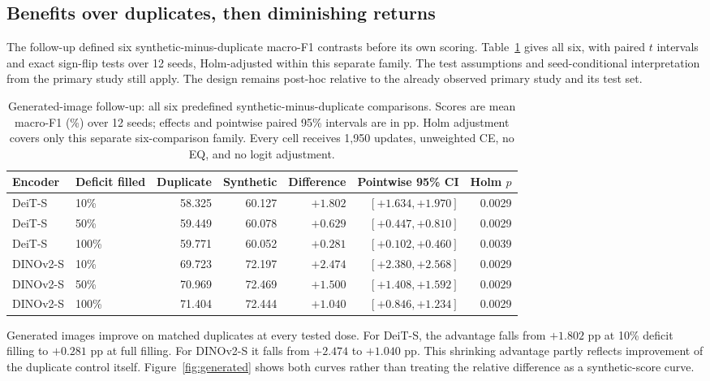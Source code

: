 \documentclass[conference]{IEEEtran}
\begin{document}
\subsection{Benefits over duplicates, then diminishing returns}
The follow-up defined six synthetic-minus-duplicate macro-F1 contrasts before its own scoring. Table~\ref{tab:generated} gives all six, with paired $t$ intervals and exact sign-flip tests over 12 seeds, Holm-adjusted within this separate family. The test assumptions and seed-conditional interpretation from the primary study still apply. The design remains post-hoc relative to the already observed primary study and its test set.

\begin{table}[t]
\centering\footnotesize
\caption{Generated-image follow-up: all six predefined synthetic-minus-duplicate comparisons. Scores are mean macro-F1 (\%) over 12 seeds; effects and pointwise paired 95\% intervals are in pp. Holm adjustment covers only this separate six-comparison family. Every cell receives 1,950 updates, unweighted CE, no EQ, and no logit adjustment.}
\label{tab:generated}
\begin{tabular}{llrrrrr}
\toprule
Encoder & Deficit filled & Duplicate & Synthetic & Difference & Pointwise 95\% CI & Holm $p$ \\
\midrule
DeiT-S & 10\% & 58.325 & 60.127 & $+1.802$ & $[+1.634,+1.970]$ & 0.0029 \\
DeiT-S & 50\% & 59.449 & 60.078 & $+0.629$ & $[+0.447,+0.810]$ & 0.0029 \\
DeiT-S & 100\% & 59.771 & 60.052 & $+0.281$ & $[+0.102,+0.460]$ & 0.0039 \\
DINOv2-S & 10\% & 69.723 & 72.197 & $+2.474$ & $[+2.380,+2.568]$ & 0.0029 \\
DINOv2-S & 50\% & 70.969 & 72.469 & $+1.500$ & $[+1.408,+1.592]$ & 0.0029 \\
DINOv2-S & 100\% & 71.404 & 72.444 & $+1.040$ & $[+0.846,+1.234]$ & 0.0029 \\
\bottomrule
\end{tabular}
\end{table}

Generated images improve on matched duplicates at every tested dose. For DeiT-S, the advantage falls from $+1.802$ pp at 10\% deficit filling to $+0.281$ pp at full filling. For DINOv2-S it falls from $+2.474$ to $+1.040$ pp. This shrinking advantage partly reflects improvement of the duplicate control itself. Figure~\ref{fig:generated} shows both curves rather than treating the relative difference as a synthetic-score curve.
\end{document}
